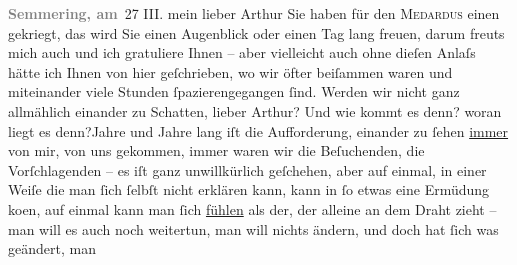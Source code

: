 \begin{ledgroupsized}[t]{13cm}
           \pstart
           \noindent{}\raggedleft{}\textcolor{gray}{\textbf{Semmering, am}} 27 III.\pend
           \pstart{}mein lieber Arthur \pend\pstart
           Sie haben für den \textsc{Medardus} einen \label{K_L02167_1v}\label{K_L02167_1h} gekriegt, das wird Sie einen Augenblick oder einen Tag lang
               freuen, darum freuts mich auch und ich gratuliere Ihnen – aber vielleicht auch ohne
               dieſen Anlaſs {\pb}hätte ich Ihnen von
               hier geſchrieben, wo wir öfter beiſammen waren und miteinander viele Stunden
               ſpazierengegangen ſind.\pend
           \pstart
           Werden wir nicht ganz allmählich einander zu Schatten, lieber Arthur?\pend
           \pstart
           Und wie kommt es denn? woran liegt es denn?\hspace*{1.5em}Jahre
               und Jahre lang iſt die Aufforderung, einander zu ſehen \uline{immer} von mir, von uns gekommen, immer waren wir die Beſuchenden, die
               Vorſchlagenden – es iſt ganz unwillkürlich {\pb}geſchehen, aber auf einmal, in
               einer Weiſe die man ſich ſelbſt nicht erklären kann, kann in ſo etwas eine Ermüdung
                  ko{\geminationm}en, auf einmal kann man ſich \uline{fühlen} als der, der alleine an dem Draht zieht – man will es
               auch noch weitertun, man will nichts ändern, und doch hat ſich was geändert, man

\end{ledgroupsized}
